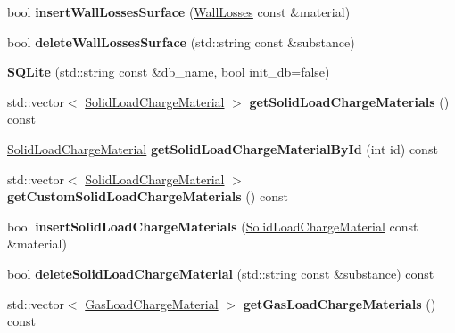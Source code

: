 \begin{DoxyCompactItemize}
bool {\bfseries insert\+Wall\+Losses\+Surface} (\hyperlink{class_wall_losses}{Wall\+Losses} const \&material)
\item 
\mbox{\label{class_s_q_lite_aa43f3d56f7caddaef26ad1eccef04118}} 
bool {\bfseries delete\+Wall\+Losses\+Surface} (std\+::string const \&substance)
\item 
\mbox{\label{class_s_q_lite_a758f334ed7e72820f4f0e83d2b707625}} 
{\bfseries S\+Q\+Lite} (std\+::string const \&db\+\_\+name, bool init\+\_\+db=false)
\item 
\mbox{\label{class_s_q_lite_af6195f55e9658c24a8f14b884e490acb}} 
std\+::vector$<$ \hyperlink{class_solid_load_charge_material}{Solid\+Load\+Charge\+Material} $>$ {\bfseries get\+Solid\+Load\+Charge\+Materials} () const
\item 
\mbox{\label{class_s_q_lite_ab2a00b913321a96a4d7b700627195616}} 
\hyperlink{class_solid_load_charge_material}{Solid\+Load\+Charge\+Material} {\bfseries get\+Solid\+Load\+Charge\+Material\+By\+Id} (int id) const
\item 
\mbox{\label{class_s_q_lite_a868c571d80d43a991762ec20c168ebb2}} 
std\+::vector$<$ \hyperlink{class_solid_load_charge_material}{Solid\+Load\+Charge\+Material} $>$ {\bfseries get\+Custom\+Solid\+Load\+Charge\+Materials} () const
\item 
\mbox{\label{class_s_q_lite_a5c40ac3b9a6abb85c9cfbe50802672c5}} 
bool {\bfseries insert\+Solid\+Load\+Charge\+Materials} (\hyperlink{class_solid_load_charge_material}{Solid\+Load\+Charge\+Material} const \&material)
\item 
\mbox{\label{class_s_q_lite_a87415ea66b330bc919acaaf042c8ff02}} 
bool {\bfseries delete\+Solid\+Load\+Charge\+Material} (std\+::string const \&substance) const
\item 
\mbox{\label{class_s_q_lite_accd7e97b19298b75eabc3a2b4bbc9b1c}} 
std\+::vector$<$ \hyperlink{class_gas_load_charge_material}{Gas\+Load\+Charge\+Material} $>$ {\bfseries get\+Gas\+Load\+Charge\+Materials} () const
\item 
\mbox{\label{class_s_q_lite_ab89ac4049cbedcb6340f5d7d0139b89e}} 

\end{DoxyCompactItemize}
